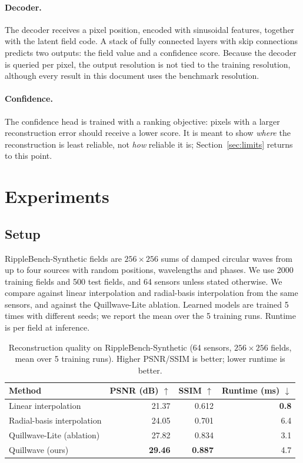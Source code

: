 \documentclass[11pt,a4paper]{article}
\begin{document}
\paragraph{Decoder.} The decoder receives a pixel position, encoded with sinusoidal features, together
with the latent field code. A stack of fully connected layers with skip connections predicts two outputs:
the field value and a confidence score. Because the decoder is queried per pixel, the output resolution is
not tied to the training resolution, although every result in this document uses the benchmark resolution.

\paragraph{Confidence.} The confidence head is trained with a ranking objective: pixels with a larger
reconstruction error should receive a lower score. It is meant to show \emph{where} the reconstruction is
least reliable, not \emph{how} reliable it is; Section~\ref{sec:limits} returns to this point.

\section{Experiments}
\subsection{Setup}
RippleBench-Synthetic fields are $256\times256$ sums of damped circular waves from up to four
sources with random positions, wavelengths and phases. We use 2000 training fields and 500 test fields,
and 64 sensors unless stated otherwise. We compare against linear interpolation and radial-basis
interpolation from the same sensors, and against the Quillwave-Lite ablation. Learned models are trained
5 times with different seeds; we report the mean over the 5 training runs. Runtime is per
field at inference.
\begin{table}[t]\centering\small
\caption{Reconstruction quality on RippleBench-Synthetic (64 sensors, $256\times256$ fields, mean over 5 training runs). Higher PSNR/SSIM is better; lower runtime is better.}\label{tab:main}
\begin{tabular}{lrrr}\toprule
Method & PSNR (dB) $\uparrow$ & SSIM $\uparrow$ & Runtime (ms) $\downarrow$ \\\midrule
Linear interpolation & 21.37 & 0.612 & \textbf{0.8} \\
Radial-basis interpolation & 24.05 & 0.701 & 6.4 \\
Quillwave-Lite (ablation) & 27.82 & 0.834 & 3.1 \\
Quillwave (ours) & \textbf{29.46} & \textbf{0.887} & 4.7 \\
\bottomrule\end{tabular}
\end{table}
\end{document}
